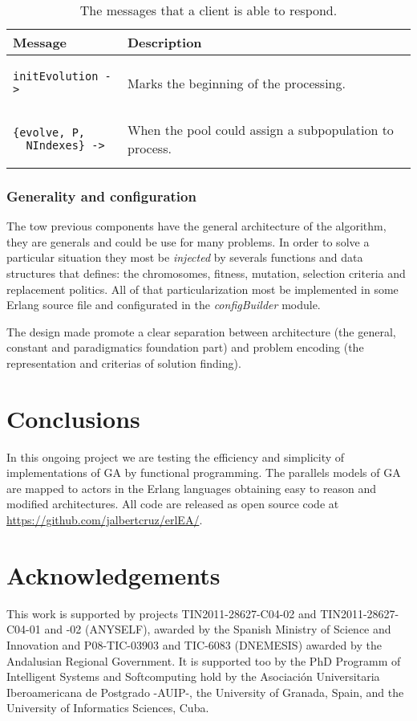 \documentclass{acm_proc_article-sp}
\begin{document}
\begin{table}
  \centering
   \begin{tabular}{|p{3cm}|p{4cm}|}
   \hline
   \textbf{Message} & \textbf{Description}\\
     \hline
\begin{verbatim}
initEvolution ->
\end{verbatim} & Marks the beginning of the processing. \\
\hline
\begin{verbatim}
{evolve, P, 
  NIndexes} ->
\end{verbatim} & When the pool could assign a subpopulation to process. \\
\hline
\end{tabular}
  \caption{The messages that a client is able to respond.}\label{clientTable}
\end{table}

\subsubsection{Generality and configuration}

The tow previous components have the general architecture of the algorithm, they are generals and could be use for many problems. In order to solve a particular situation they most be \emph{injected} by severals functions and data structures that defines: the chromosomes, fitness, mutation, selection criteria and replacement politics. All of that particularization most be implemented in some Erlang source file and configurated in the \emph{configBuilder} module.

The design made promote a clear separation between architecture (the general, constant and paradigmatics foundation part) and problem encoding (the representation and criterias of solution finding).

\section{Conclusions}

In this ongoing project we are testing the efficiency and simplicity of implementations of GA by functional programming. The parallels models of GA are mapped to actors in the Erlang languages obtaining easy to reason and modified architectures. All code are released as open source code at \url{https://github.com/jalbertcruz/erlEA/}.

\section*{Acknowledgements}
This work is supported by projects TIN2011-28627-C04-02 and TIN2011-28627-C04-01 and -02 (ANYSELF), awarded by the Spanish Ministry of Science and Innovation and P08-TIC-03903 and TIC-6083 (DNEMESIS) awarded by the Andalusian Regional Government. It is supported too by the PhD Programm of Intelligent Systems and Softcomputing hold by the Asociación Universitaria Iberoamericana de Postgrado -AUIP-, the University of Granada, Spain, and the University of Informatics Sciences, Cuba.

\nocite{*}


\balancecolumns
\end{document}
